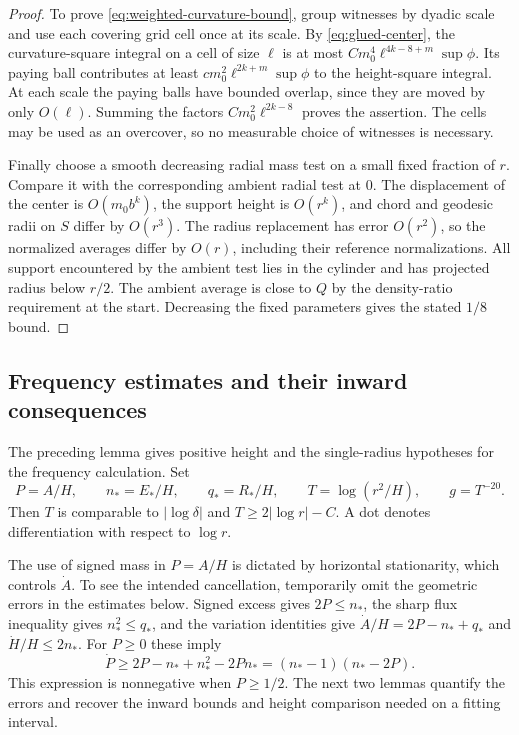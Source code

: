 \begin{proof}
To prove \eqref{eq:weighted-curvature-bound}, group witnesses by dyadic
scale and use each covering grid cell once at its scale. By
\eqref{eq:glued-center}, the curvature-square integral on a cell of
size $\ell$ is at most
$Cm_0^4\ell^{4k-8+m}\sup\phi$.
Its paying ball contributes at least
$cm_0^2\ell^{2k+m}\sup\phi$ to the height-square integral.
At each scale the paying balls have bounded overlap, since they are
moved by only $O(\ell)$. Summing the factors
$Cm_0^2\ell^{2k-8}$ proves the assertion. The cells may be used as an
overcover, so no measurable choice of witnesses is necessary.

Finally choose a smooth decreasing radial mass test on a small fixed
fraction of $r$. Compare it with the corresponding ambient radial test
at $0$. The displacement of the center is $O(m_0b^k)$, the support
height is $O(r^k)$, and chord and geodesic radii on $S$ differ by
$O(r^3)$. The radius replacement has error $O(r^2)$, so the normalized
averages differ by $O(r)$, including their reference normalizations.
All support encountered by the ambient test lies in the cylinder and
has projected radius below $r/2$. The ambient average is close to $Q$
by the density-ratio requirement at the start. Decreasing the fixed
parameters gives the stated $1/8$ bound.
\end{proof}

\subsection{Frequency estimates and their inward consequences}

The preceding lemma gives positive height and the single-radius
hypotheses for the frequency calculation. Set
\[
 P=A/H,\qquad n_*=E_*/H,\qquad q_*=R_*/H,
 \qquad T=\log(r^2/H),\qquad g=T^{-20}.
\]
Then $T$ is comparable to $|\log\delta|$ and
$T\ge2|\log r|-C$. A dot denotes differentiation with respect to
$\log r$.

The use of signed mass in $P=A/H$ is dictated by horizontal stationarity,
which controls $\dot A$. To see the intended cancellation, temporarily
omit the geometric errors in the estimates below. Signed excess gives
$2P\le n_*$, the sharp flux inequality gives $n_*^2\le q_*$,
and the variation identities give
$\dot A/H=2P-n_*+q_*$ and $\dot H/H\le2n_*$.
For $P\ge0$ these imply
\[
 \dot P\ge2P-n_*+n_*^2-2Pn_*
             =(n_*-1)(n_*-2P).
\]
This expression is nonnegative when $P\ge1/2$.
The next two lemmas quantify the errors and recover the inward bounds
and height comparison needed on a fitting interval.

